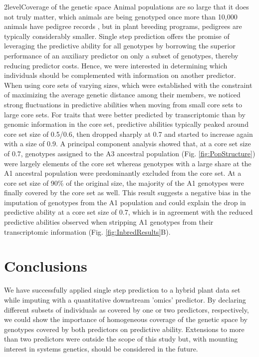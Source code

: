 \documentclass[12pt,titlepage]{article}
\begin{document}
\Genetics2level{Coverage of the genetic space}
Animal populations are so large that it does not truly matter, which animals are 
being genotyped once more than 10,000 animals have pedigree records 
\cite{Fragomeni2015,Lourenco2015,Masuda2016}, but in plant breeding programs,
pedigrees are typically considerably smaller.
Single step prediction offers the promise of leveraging the predictive ability
for all genotypes by borrowing the superior performance of an auxiliary
predictor on only a subset of genotypes, thereby reducing predictor costs.
Hence, we were interested in determining which individuals should be 
complemented with information on another predictor.
When using core sets of varying sizes, which were established with the
constraint of maximizing the average genetic distance among their members, we
noticed strong fluctuations in predictive abilities when moving from small core
sets to large core sets.
For traits that were better predicted by transcriptomic than by genomic
information in the core set, predictive abilities typically peaked around
core set size of 0.5/0.6, then dropped sharply at 0.7 and started to increase
again with a size of 0.9.
A principal component analysis showed that, at a core set size of 0.7, 
genotypes assigned to the A3 ancestral population (Fig. \ref{fig:PopStructure})
were largely elements of the core set whereas genotypes with a large share at 
the A1 ancestral population were predominantly excluded from the core set.
At a core set size of 90\% of the original size, the majority of the A1
genotypes were finally covered by the core set as well.
This result suggests a negative bias in the imputation of genotypes from the A1
population and could explain the drop in predictive ability at a core set size
of 0.7, which is in agreement with the reduced predictive abilities observed
when stripping A1 genotypes from their transcriptomic information (Fig.
\ref{fig:InbredResults}B).



\section*{Conclusions}
We have successfully applied single step prediction to a hybrid plant data set 
while imputing with a quantitative downstream 'omics' predictor.
By declaring different subsets of individuals as covered by one or two 
predictors, respectively, we could show the importance of homogeneous coverage
of the genetic space by genotypes covered by both predictors on predictive
ability.
Extensions to more than two predictors were outside the scope of this study
but, with mounting interest in systems genetics, should be considered in the
future.
\end{document}
